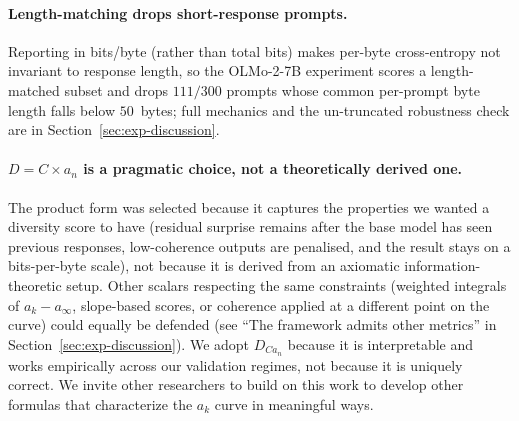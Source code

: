 \paragraph{Length-matching drops short-response prompts.}
Reporting in bits/byte (rather than total bits) makes per-byte cross-entropy not invariant to response length, so the OLMo-2-7B experiment scores a length-matched subset and drops $111/300$ prompts whose common per-prompt byte length falls below $50$~bytes; full mechanics and the un-truncated robustness check are in Section~\ref{sec:exp-discussion}.

\paragraph{$D = C \times a_n$ is a pragmatic choice, not a theoretically derived one.}
The product form was selected because it captures the properties we wanted a diversity score to have (residual surprise remains after the base model has seen previous responses, low-coherence outputs are penalised, and the result stays on a bits-per-byte scale), not because it is derived from an axiomatic information-theoretic setup.
Other scalars respecting the same constraints (weighted integrals of $a_k - a_\infty$, slope-based scores, or coherence applied at a different point on the curve) could equally be defended (see ``The framework admits other metrics'' in Section~\ref{sec:exp-discussion}).
We adopt $D_{Ca_n}$ because it is interpretable and works empirically across our validation regimes, not because it is uniquely correct.
We invite other researchers to build on this work to develop other formulas that characterize the $a_k$ curve in meaningful ways.